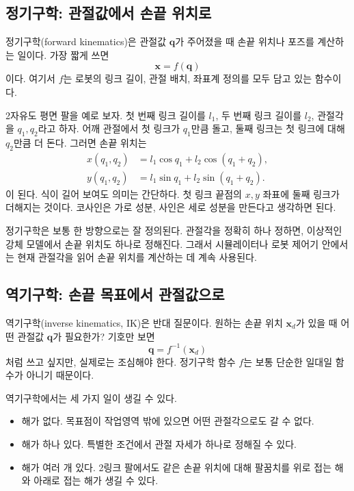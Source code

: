 \subsection{정기구학: 관절값에서 손끝 위치로}
\label{sec:robotics-forward-kinematics}

정기구학(forward kinematics)은 관절값 \(\bm{q}\)가 주어졌을 때 손끝 위치나 포즈를 계산하는 일이다.
가장 짧게 쓰면
\begin{equation}
  \bm{x}=f(\bm{q})
  \label{eq:fk-minimal}
\end{equation}
이다.
여기서 \(f\)는 로봇의 링크 길이, 관절 배치, 좌표계 정의를 모두 담고 있는 함수이다.

2자유도 평면 팔을 예로 보자.
첫 번째 링크 길이를 \(l_1\), 두 번째 링크 길이를 \(l_2\), 관절각을 \(q_1,q_2\)라고 하자.
어깨 관절에서 첫 링크가 \(q_1\)만큼 돌고, 둘째 링크는 첫 링크에 대해 \(q_2\)만큼 더 돈다.
그러면 손끝 위치는
\begin{align}
  x(q_1,q_2)
  &=
  l_1\cos q_1
  +
  l_2\cos(q_1+q_2),
  \label{eq:two-link-fk-x}
  \\
  y(q_1,q_2)
  &=
  l_1\sin q_1
  +
  l_2\sin(q_1+q_2).
  \label{eq:two-link-fk-y}
\end{align}
이 된다.
식이 길어 보여도 의미는 간단하다.
첫 링크 끝점의 \(x,y\) 좌표에 둘째 링크가 더해지는 것이다.
코사인은 가로 성분, 사인은 세로 성분을 만든다고 생각하면 된다.

정기구학은 보통 한 방향으로는 잘 정의된다.
관절각을 정확히 하나 정하면, 이상적인 강체 모델에서 손끝 위치도 하나로 정해진다.
그래서 시뮬레이터나 로봇 제어기 안에서는 현재 관절각을 읽어 손끝 위치를 계산하는 데 계속 사용된다.

\subsection{역기구학: 손끝 목표에서 관절값으로}
\label{sec:robotics-inverse-kinematics}

역기구학(inverse kinematics, IK)은 반대 질문이다.
원하는 손끝 위치 \(\bm{x}_d\)가 있을 때 어떤 관절값 \(\bm{q}\)가 필요한가?
기호만 보면
\begin{equation}
  \bm{q}=f^{-1}(\bm{x}_d)
\end{equation}
처럼 쓰고 싶지만, 실제로는 조심해야 한다.
정기구학 함수 \(f\)는 보통 단순한 일대일 함수가 아니기 때문이다.

역기구학에서는 세 가지 일이 생길 수 있다.
\begin{itemize}
  \item 해가 없다. 목표점이 작업영역 밖에 있으면 어떤 관절각으로도 갈 수 없다.
  \item 해가 하나 있다. 특별한 조건에서 관절 자세가 하나로 정해질 수 있다.
  \item 해가 여러 개 있다. 2링크 팔에서도 같은 손끝 위치에 대해 팔꿈치를 위로 접는 해와 아래로 접는 해가 생길 수 있다.
\end{itemize}

